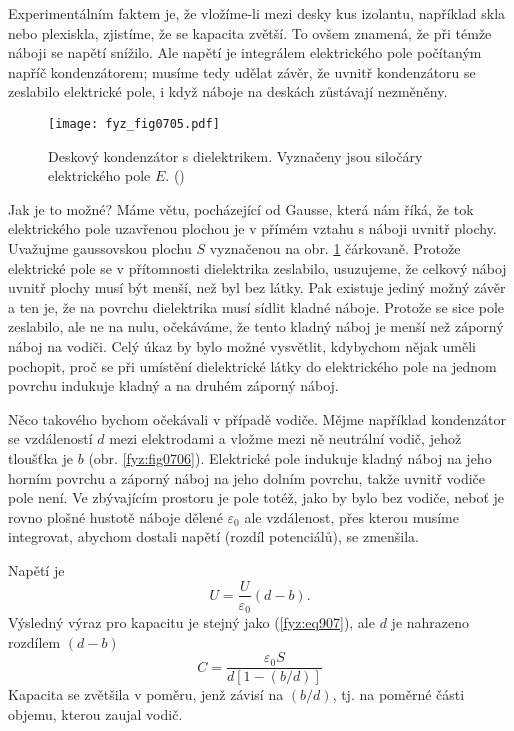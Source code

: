     Experimentálním faktem je, že vložíme-li mezi desky kus izolantu, například skla nebo plexiskla,
    zjistíme, že se kapacita zvětší. To ovšem znamená, že při témže náboji se napětí snížilo. Ale
    napětí je integrálem elektrického pole počítaným napříč kondenzátorem; musíme tedy udělat závěr,
    že uvnitř kondenzátoru se zeslabilo elektrické pole, i když náboje na deskách zůstávají
    nezměněny.

    \begin{figure}[ht!] %
      \centering
      \texttt{[image: fyz\_fig0705.pdf]}
      \caption{Deskový kondenzátor s dielektrikem. Vyznačeny jsou siločáry elektrického pole \(E\).
               (\cite[s.~175]{Feynman02})}
      \label{fyz:fig0705}
    \end{figure}

    Jak je to možné? Máme větu, pocházející od Gausse, která nám říká, že tok elektrického pole
    uzavřenou plochou je v přímém vztahu s náboji uvnitř plochy. Uvažujme gaussovskou plochu \(S\)
    vyznačenou na obr. \ref{fyz:fig0705} čárkovaně. Protože elektrické pole se v přítomnosti
    dielektrika zeslabilo, usuzujeme, že celkový náboj uvnitř plochy musí být menší, než byl bez
    látky. Pak existuje jediný možný závěr a ten je, že na povrchu dielektrika musí sídlit kladné
    náboje. Protože se sice pole zeslabilo, ale ne na nulu, očekáváme, že tento kladný náboj je
    menší než záporný náboj na vodiči. Celý úkaz by bylo možné vysvětlit, kdybychom nějak uměli
    pochopit, proč se při umístění dielektrické látky do elektrického pole na jednom povrchu
    indukuje kladný a na druhém záporný náboj.

    Něco takového bychom očekávali v případě vodiče. Mějme například kondenzátor se vzdáleností
    \(d\) mezi elektrodami a vložme mezi ně neutrální vodič, jehož tloušťka je \(b\) (obr.
    \ref{fyz:fig0706}). Elektrické pole indukuje kladný náboj na jeho horním povrchu a záporný náboj
    na jeho dolním povrchu, takže uvnitř vodiče pole není. Ve zbývajícím prostoru je pole totéž,
    jako by bylo bez vodiče, neboť je rovno plošné hustotě náboje dělené \(\varepsilon_0\) ale
    vzdálenost, přes kterou musíme integrovat, abychom dostali napětí (rozdíl potenciálů), se
    zmenšila.

    Napětí je
    \begin{equation*}
      U = \dfrac{U}{\varepsilon_0}(d-b).
    \end{equation*}
    Výsledný výraz pro kapacitu je stejný jako (\ref{fyz:eq907}), ale \(d\) je nahrazeno rozdílem
    \((d - b)\)
    \begin{equation}\label{fyz:eq909}
      C = \dfrac{\varepsilon_0S}{d\left[1 - (b/d)\right]}
    \end{equation}
    Kapacita se zvětšila v poměru, jenž závisí na \((b/d)\), tj. na poměrné části objemu, kterou
    zaujal vodič.

